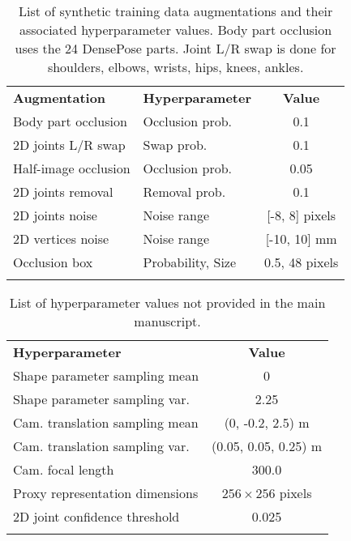 \documentclass[final]{cvpr}
\begin{document}
\begin{table}[t]
\centering
\small
\begin{tabular}{l l c}
    \hline
    \noalign{\smallskip} 
    \textbf{Augmentation} & \textbf{Hyperparameter} & \textbf{Value}\\
    \noalign{\smallskip}
    \hline
    \noalign{\smallskip}
    Body part occlusion & Occlusion prob. & 0.1 \\
    2D joints L/R swap & Swap prob. & 0.1\\
    Half-image occlusion & Occlusion prob. & 0.05\\
    2D joints removal & Removal prob. & 0.1\\
    2D joints noise & Noise range & [-8, 8] pixels\\
    2D vertices noise & Noise range & [-10, 10] mm \\
    Occlusion box & Probability, Size & 0.5, 48 pixels \\
    \noalign{\smallskip}
    \hline
    \noalign{\smallskip}
    \noalign{\smallskip}
    \end{tabular}
\caption{List of synthetic training data augmentations and their associated hyperparameter values. Body part occlusion uses the 24 DensePose \cite{Guler2018DensePose} parts. Joint L/R swap is done for shoulders, elbows, wrists, hips, knees, ankles.}
\label{table:sup_mat_augment_hypparams}
\end{table}

\begin{table}[t]
\centering
\small
\begin{tabular}{l c}
    \hline
    \noalign{\smallskip} 
    \textbf{Hyperparameter} & \textbf{Value}\\
    \noalign{\smallskip}
    \hline
    \noalign{\smallskip}
    Shape parameter sampling mean & 0 \\
    Shape parameter sampling var. & 2.25 \\
    Cam. translation sampling mean & (0, -0.2, 2.5) m\\
    Cam. translation sampling var. & (0.05, 0.05, 0.25) m\\
    Cam. focal length & 300.0\\
    Proxy representation dimensions & $256 \times 256$ pixels\\
    2D joint confidence threshold & 0.025\\
    \noalign{\smallskip}
    \hline
    \noalign{\smallskip}
    \noalign{\smallskip}
    \end{tabular}
\caption{List of hyperparameter values not provided in the main manuscript.}
\label{table:sup_mat_hypparams}
\end{table}
\end{document}
